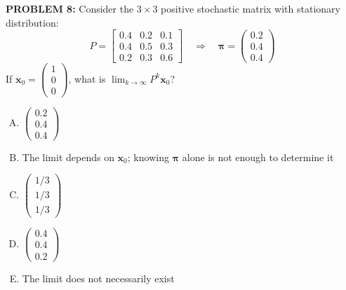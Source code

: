 \documentclass[12pt]{amsart}
\begin{document}
{\bf PROBLEM 8:}
%
Consider the $3 \times 3$ positive stochastic matrix with stationary distribution:
$$P = \begin{bmatrix} 
0.4 & 0.2 & 0.1 \\ 
0.4 & 0.5 & 0.3 \\ 
0.2 & 0.3 & 0.6 
\end{bmatrix} \quad \Rightarrow \quad 
\boldsymbol{\pi} = \begin{pmatrix} 0.2 \\ 0.4 \\ 0.4 \end{pmatrix}$$
%
If %
$\mathbf{x}_0 = \begin{pmatrix} 1 \\ 0 \\ 0 \end{pmatrix}$, 
what is $\displaystyle\lim_{k \to \infty} P^k \mathbf{x}_0$?
\begin{enumerate}[(A)]
\item $\begin{pmatrix} 0.2 \\ 0.4 \\ 0.4 \end{pmatrix}$
\item The limit depends on $\mathbf{x}_0$; knowing 
      $\boldsymbol{\pi}$ alone is not enough to determine it
\item $\begin{pmatrix} 1/3 \\ 1/3 \\ 1/3 \end{pmatrix}$
\item $\begin{pmatrix} 0.4 \\ 0.4 \\ 0.2 \end{pmatrix}$
\item The limit does not necessarily exist
\end{enumerate}
%
\end{document}
